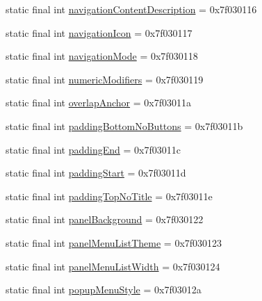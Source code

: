 \begin{DoxyCompactItemize}
static final int \mbox{\hyperlink{classandroid_1_1support_1_1v7_1_1appcompat_1_1_r_1_1attr_ad1123c667a7f56bf93873c4fdd514e58}{navigation\+Content\+Description}} = 0x7f030116
\item 
static final int \mbox{\hyperlink{classandroid_1_1support_1_1v7_1_1appcompat_1_1_r_1_1attr_a2adad3c9532705970eaaa826317fba55}{navigation\+Icon}} = 0x7f030117
\item 
static final int \mbox{\hyperlink{classandroid_1_1support_1_1v7_1_1appcompat_1_1_r_1_1attr_a27c70295f7cf8714ed8f97d4e89ffb06}{navigation\+Mode}} = 0x7f030118
\item 
static final int \mbox{\hyperlink{classandroid_1_1support_1_1v7_1_1appcompat_1_1_r_1_1attr_a0da3a102e7d4ddecb4cebfe2e430c0a0}{numeric\+Modifiers}} = 0x7f030119
\item 
static final int \mbox{\hyperlink{classandroid_1_1support_1_1v7_1_1appcompat_1_1_r_1_1attr_aff68b243ea6c12550257c7d3c81c7cf8}{overlap\+Anchor}} = 0x7f03011a
\item 
static final int \mbox{\hyperlink{classandroid_1_1support_1_1v7_1_1appcompat_1_1_r_1_1attr_a90fe24b4eb9764c84e3c686851d716ee}{padding\+Bottom\+No\+Buttons}} = 0x7f03011b
\item 
static final int \mbox{\hyperlink{classandroid_1_1support_1_1v7_1_1appcompat_1_1_r_1_1attr_a70fe98d6e34a3f8cfe4c637aea1d7bd3}{padding\+End}} = 0x7f03011c
\item 
static final int \mbox{\hyperlink{classandroid_1_1support_1_1v7_1_1appcompat_1_1_r_1_1attr_aa716593dd9b911d645d5f24fa1d0d05f}{padding\+Start}} = 0x7f03011d
\item 
static final int \mbox{\hyperlink{classandroid_1_1support_1_1v7_1_1appcompat_1_1_r_1_1attr_a8b25643e217d730b7ced18a5e9ac3b51}{padding\+Top\+No\+Title}} = 0x7f03011e
\item 
static final int \mbox{\hyperlink{classandroid_1_1support_1_1v7_1_1appcompat_1_1_r_1_1attr_af583f6f704e006a6642ec0774511fd39}{panel\+Background}} = 0x7f030122
\item 
static final int \mbox{\hyperlink{classandroid_1_1support_1_1v7_1_1appcompat_1_1_r_1_1attr_a2135b6ddda76698d615eb70b7dfd947a}{panel\+Menu\+List\+Theme}} = 0x7f030123
\item 
static final int \mbox{\hyperlink{classandroid_1_1support_1_1v7_1_1appcompat_1_1_r_1_1attr_a9147d08a5e9a83452728a0a6ba43c322}{panel\+Menu\+List\+Width}} = 0x7f030124
\item 
static final int \mbox{\hyperlink{classandroid_1_1support_1_1v7_1_1appcompat_1_1_r_1_1attr_ab0fa39a065771ab5b0b3c67ad7669ec8}{popup\+Menu\+Style}} = 0x7f03012a

\end{DoxyCompactItemize}
